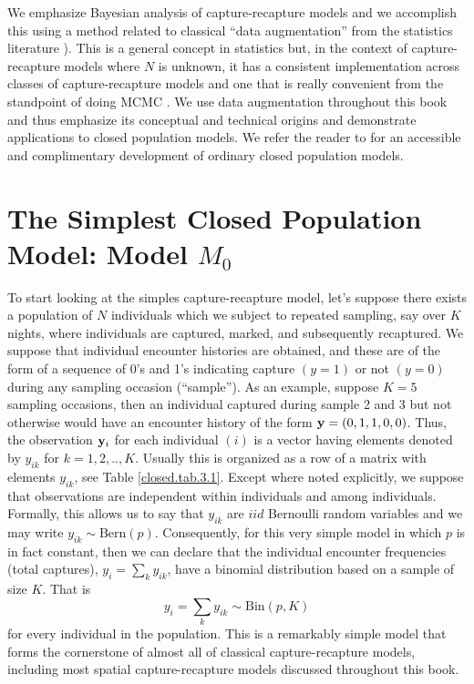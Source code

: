 We emphasize Bayesian analysis of capture-recapture models and we
accomplish this using a method related to classical ``data
augmentation'' from the statistics literature 
\citep[e.g.,][]{tanner_wong:1987}).  This is a general concept in
statistics but, in the context of capture-recapture models where $N$
is unknown, it has a consistent implementation across classes of
capture-recapture models and one that is really convenient from the
standpoint of doing MCMC \citep{royle_etal:2007}. We use data
augmentation throughout this book and thus emphasize its conceptual
and technical origins and demonstrate applications to closed
population models.  We refer the reader to
\citet[][ch. 6]{kery_schaub:2011} for an accessible and complimentary
development of ordinary closed population models.


\section{The Simplest Closed Population Model: Model $M_0$}

To start looking at the simples capture-recapture model, let's suppose  
there exists a population of $N$ individuals which we
subject to repeated sampling, say over $K$ nights, where individuals
are captured, marked, and subsequently recaptured.  We suppose that
individual encounter histories are obtained, and these are of the form
of a sequence of 0's and 1's indicating capture $(y=1)$ or not $(y=0)$
during any sampling occasion (``sample'').  As an example, suppose
$K=5$ sampling occasions, then an individual captured during sample 2
and 3 but not otherwise would have an encounter history of the form
${\bf y}=(0,1,1,0,0)$. Thus, the observation ${\bf y}_{i}$ for each
individual $(i)$ is a vector having elements denoted by $y_{ik}$ for
$k=1,2,..,K$. Usually this is organized as a row of a matrix with
elements $y_{ik}$, see Table \ref{closed.tab.3.1}.  Except where noted
explicitly, we suppose that observations are independent within
individuals and among individuals.  Formally, this allows us to say
that $y_{ik}$ are $iid$ Bernoulli random variables and we may write $y_{ik}
\sim \mbox{Bern}(p)$.  Consequently, for this very simple model in
which $p$ is in fact constant, then we can declare that the individual
encounter frequencies (total captures), $y_{i} = \sum_{k} y_{ik}$,
have a binomial distribution based on a sample of size $K$. That is
\[
y_{i}  = \sum_{k} y_{ik} \sim \mbox{Bin}(p,K)
\]
for every individual in the population. This is a remarkably simple
model that forms the cornerstone of almost all of classical
capture-recapture models, including most spatial capture-recapture
models discussed throughout this book.  

